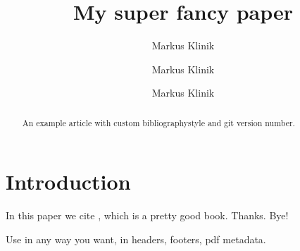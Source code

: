 \documentclass[a4paper]{article}
\title{My super fancy paper}
\author{
       Markus Klinik
  \and Markus Klinik
  \and Markus Klinik
}
\begin{document}
\maketitle
\thispagestyle{fancy}

\begin{abstract}
An example article with custom bibliographystyle and git version number.
\end{abstract}

\section{Introduction}

In this paper we cite \citet{Nielson1999}, which is a pretty good book.
Thanks. Bye!

Use {\version} in any way you want, in headers, footers, pdf metadata.



\end{document}
